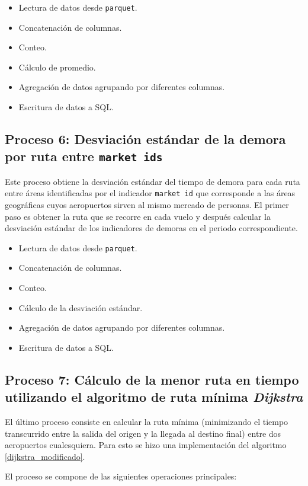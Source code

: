 \begin{itemize}
	\item Lectura de datos desde \texttt{parquet}.
	\item Concatenación de columnas.
	\item Conteo.
	\item Cálculo de promedio.
	\item Agregación de datos agrupando por diferentes columnas.
	\item Escritura de datos a SQL.
\end{itemize}

\subsection{Proceso 6: Desviación estándar de la demora por ruta entre \texttt{market ids}}

Este proceso obtiene la desviación estándar del tiempo de demora para cada ruta entre áreas identificadas por el indicador \texttt{market id} que corresponde a las áreas geográficas cuyos aeropuertos sirven al mismo mercado de personas. El primer paso es obtener la ruta que se recorre en cada vuelo y después calcular la desviación estándar de los indicadores de demoras en el periodo correspondiente.

\begin{itemize}
	\item Lectura de datos desde \texttt{parquet}.
	\item Concatenación de columnas.
	\item Conteo.
	\item Cálculo de la desviación estándar.
	\item Agregación de datos agrupando por diferentes columnas.
	\item Escritura de datos a SQL.
\end{itemize}


\subsection{Proceso 7: Cálculo de la menor ruta en tiempo utilizando el algoritmo de ruta mínima \textit{Dijkstra}}

El último proceso consiste en calcular la ruta mínima (minimizando el tiempo transcurrido entre la salida del origen y la llegada al destino final) entre dos aeropuertos cualesquiera. Para esto se hizo una implementación del algoritmo \ref{dijkstra_modificado}.   

El proceso se compone de las siguientes operaciones principales:

